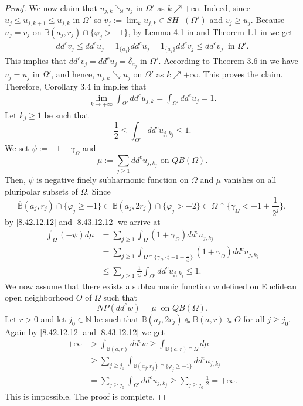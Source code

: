 \documentclass[3p,times]{elsarticle}
\numberwithin{equation}{section}
\newtheorem{The main theorem}[theorem]{The main theorem}
\theoremstyle{definition}
\begin{document}
\begin{proof}
We now claim that $u_{j,k} \searrow u_j$ in $\Omega'$ as $k\nearrow +\infty$. 
Indeed, since $u_j \leq u_{j,k+1} \leq u_{j,k} $ in $\Omega'$ so  $v_j:= \lim_k u_{j,k} \in SH^-(\Omega')$ and   $v_j \geq u_j$. Because  $u_j=v_j$ on $ \mathbb B(a_j,r_j) \cap \{\varphi_j >-1\}$,  by  Lemma 4.1 in \cite{ACCH} and  
Theorem 1.1 in \cite{HHiep16}  we get
\begin{align*}
 dd^c v_{j} 
\leq    dd^c u_{j} 
=1 _{\{a_j\}} dd^c u_{j} 
=1 _{\{a_j\}} dd^c v_{j} 
\leq  dd^c v_{j}  \ \text{ in } \Omega'.
\end{align*}
This implies that  $ dd^c v_{j}  =  dd^c u_{j}  = \delta_{a_j}$ in $\Omega'$. 
According to Theorem 3.6 in \cite{ACCH} we have 
$v_j=u_j$ in $\Omega'$, and hence, $u_{j,k} \searrow u_j$ on $\Omega'$ as $k\nearrow +\infty$. This proves the claim.  Therefore, Corollary 3.4 in \cite{ACCH} implies that 
\begin{align*}
\lim_{k\to+\infty} \int _{\Omega'} dd^c u_{j,k}
=  \int _{\Omega'} dd^c u_{j} = 1.
\end{align*}
Let  $k_j\geq 1$ be such that  
\begin{equation} \label{8.43.12.12}
 \frac{1}{2} \leq  \int _{\Omega'} dd^c u_{j, k_j}  \leq  1 .
\end{equation}
We set $\psi := -1-\gamma_\Omega  $ and 
$$\mu:= \sum_{j \geq 1} dd^c u_{j, k_j}   \text{ on } QB(\Omega ).
$$ 
Then, $\psi$ is negative finely subharmonic function on $\Omega$ and $\mu$ vanishes on all pluripolar subsets of $\Omega$.
Since 
$$ \overline{ \mathbb B} (a_j,r_j) \cap \{\varphi_j \geq -1\} 
\subset \mathbb B  (a_j, 2 r_j) \cap \{\varphi_j > -2\}
\subset 
 \Omega \cap    \{ \gamma_\Omega < -1+ \frac{1}{2^{j} } \}   ,$$
 by   \eqref{8.42.12.12} and \eqref{8.43.12.12} we arrive at 
\begin{align*}
\int_\Omega (-\psi ) d \mu 
& =\sum_{j\geq 1} \int_\Omega (1+ \gamma_\Omega )  dd^c u_{j,k_j} 
\\ & =\sum_{j\geq 1} \int_{ \Omega  \cap   \{    \gamma_\Omega <  -1+ \frac{1}{2^{j} } \}}  (1+ \gamma_\Omega )  dd^c u_{j,k_j} 
\\& \leq \sum_{j\geq 1}  \frac{1}{2^{j} } \int_{ \Omega' }  dd^c u_{j,k_j}  
\leq 1.
\end{align*}
We now assume that there exists a  subharmonic function $w$ defined on Euclidean open neighborhood $O$ of $\Omega$ such that 
$$NP(dd^c w)  =\mu \ \text{ on } QB(\Omega).$$
Let $r>0$ and let $j_0 \in \mathbb N$ be such that $\mathbb B(a_j, 2 r_j) \Subset \mathbb B(a,r) \Subset O$ for all $j\geq j_0$.  
Again by \eqref{8.42.12.12} and \eqref{8.43.12.12} we get 
\begin{align*}
+\infty
& > \int_{\mathbb B(a,r)}  dd^c w 
 \geq \int_{\mathbb B(a,r) \cap \Omega}  d \mu  
\\ & \geq \sum_{j\geq j_0} \int_{\overline {\mathbb B}(a_j,r_j) \cap \{\varphi_j \geq -1\} }  dd^c u_{j,k_j}
\\ & = \sum_{j\geq j_0} \int_{ \Omega '}  dd^c u_{j,k_j}
 \geq \sum_{j\geq j_0}    \frac{1}{2}
=+\infty.
\end{align*}
This is impossible. The proof is complete. 
\end{proof}
\end{document}
